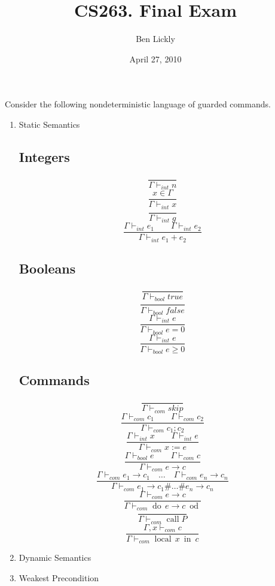 \documentclass{article}
\title{CS263. Final Exam}
\author{Ben Lickly}
\date{April 27, 2010}
\newcommand{\problem}[1]
{\subsubsection*{} %
\vspace{-16pt} \section{} \vspace{-22pt} \qquad
#1%
\bigskip \bigskip
}
\newcommand{\proves}{\vdash}
\newcommand{\dood}[1]{\operatorname{do}\, #1\ \operatorname{od}}
\newcommand{\localin}[2]{\operatorname{local}\, #1\ \operatorname{in}\ #2}
\begin{document}
\maketitle

\problem{Consider the following nondeterministic language of guarded commands.
}
\begin{enumerate}
  \item Static Semantics

\subsection*{Integers}
\[\frac{}
{\Gamma \proves_{int} n}
\]
\[\frac{x \in \Gamma}
{\Gamma \proves_{int} x}
\]
\[\frac{}
{\Gamma \proves_{int} g}
\]
\[\frac{\Gamma \proves_{int} e_1 \qquad \Gamma \proves_{int} e_2}
{\Gamma \proves_{int} e_1 + e_2}
\]

\subsection*{Booleans}
\[\frac{}
{\Gamma \proves_{bool} true}
\]
\[\frac{}
{\Gamma \proves_{bool} false}
\]
\[\frac{\Gamma \proves_{int} e}
{\Gamma \proves_{bool} e = 0}
\]
\[\frac{\Gamma \proves_{int} e}
{\Gamma \proves_{bool} e \ge 0}
\]

\subsection*{Commands}
\[\frac{}
{\Gamma \proves_{com} skip}
\]
\[\frac{\Gamma \proves_{com} c_1 \qquad \Gamma \proves_{com} c_2}
{\Gamma \proves_{com} c_1; c_2}
\]
\[\frac{\Gamma \proves_{int} x \qquad \Gamma \proves_{int} e}
{\Gamma \proves_{com} x := e}
\]
\[\frac{\Gamma \proves_{bool} e \qquad \Gamma \proves_{com} c}
{\Gamma \proves_{com} e \rightarrow c}
\]
\[\frac{\Gamma \proves_{com} e_1 \rightarrow c_1 \quad \dots \quad
        \Gamma \proves_{com} e_n \rightarrow c_n}
{\Gamma \proves_{com} e_1 \rightarrow c_1 \# \dots \# e_n \rightarrow c_n}
\]
\[\frac{\Gamma \proves_{com} e \rightarrow c}
{\Gamma \proves_{com} \dood{e \rightarrow c}}
\]
\[\frac{}
{\Gamma \proves_{com} \operatorname{call} P}
\]
\[\frac{\Gamma,x \proves_{com} c}
{\Gamma \proves_{com} \localin{x}{c}}
\]

  \item Dynamic Semantics
  \item Weakest Precondition
\end{enumerate}
\end{document}
